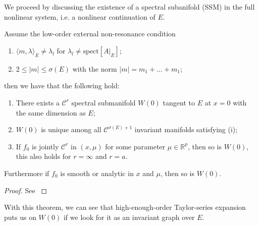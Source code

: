 We proceed by discussing the existence of a spectral subanifold (SSM) in the full nonlinear system, i.e. a nonlinear continuation of $E$. 
\begin{theorem}[]
Assume the low-order external non-resonance condition
\begin{enumerate}
	\item $\langle m, \lambda \rangle_{E} \neq \lambda _l$ for $\lambda_l \neq  \textrm{spect}[A|_{E}] $;
	\item $2 \leq |m| \leq \sigma(E)$ with the norm $|m | =m_1 + \ldots + m_1$;
\end{enumerate}
then we have that the following hold:
\begin{enumerate}
	\item There exists a $\mathcal{C}^{r}$ spectral submanifold $W(0)$ tangent to $E$ at $x=0$ with the same dimension as $E$;
	\item $W(0)$ is unique among all $\mathcal{C}^{\sigma(E) + 1}$ invariant manifolds satisfying (i);
	\item If $f_0$ is jointly $\mathcal{C}^{r}$ in $(x,\mu )$ for some parameter $\mu \in \mathbb{R}^{p}$, then so is $W(0)$, this also holds for $r=\infty $ and $r=a$. 
\end{enumerate}
Furthermore if $f_0$ is smooth or analytic in  $x$ and $\mu $, then so is $W(0)$.
\end{theorem}
\begin{proof}
	See \cite{Ponsioen2016}
\end{proof}
With this theorem, we can see that high-enough-order Taylor-series expansion puts us on $W(0)$ if we look for it as an invariant graph over $E$.

